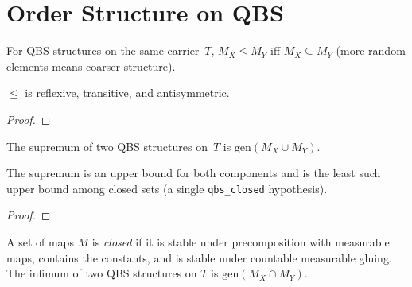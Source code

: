 \section{Order Structure on QBS}\label{sec:order}

\begin{definition}\label{def:qbs_leT}
  \rocqok
  For QBS structures on the same carrier~$T$,
  $M_X \leq M_Y$ iff $M_X \subseteq M_Y$ (more random elements
  means coarser structure).
\end{definition}

\begin{lemma}\label{lem:qbs_leT_order}
  \rocqok
  $\leq$ is reflexive, transitive, and antisymmetric.
\end{lemma}
\begin{proof}\rocqok\end{proof}

\begin{definition}\label{def:qbs_supT}
  \rocqok
  The supremum of two QBS structures on~$T$ is
  $\mathrm{gen}(M_X \cup M_Y)$.
\end{definition}

\begin{lemma}\label{lem:qbs_supT_props}
  \rocqok
  The supremum is an upper bound for both components and is the least
  such upper bound among closed sets (a single \texttt{qbs\_closed} hypothesis).
\end{lemma}
\begin{proof}\rocqok\end{proof}

\begin{definition}\label{def:qbs_infT}
  \rocqok
  A set of maps $M$ is \emph{closed} if it is stable under precomposition with measurable maps, contains the constants, and is stable under countable measurable gluing. The infimum of two QBS structures on $T$ is $\mathrm{gen}(M_X \cap M_Y)$.
\end{definition}

